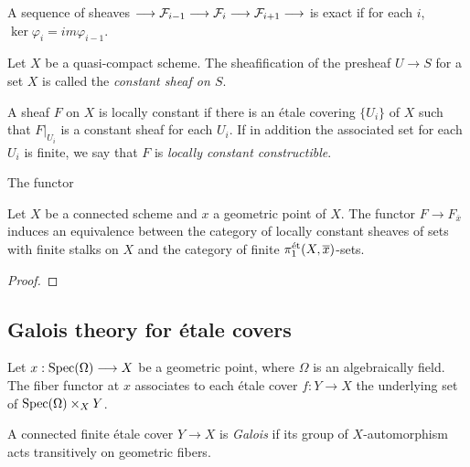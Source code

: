 \begin{definition}
  A sequence of sheaves $\longrightarrow \mathcal{F}_{i-1} \longrightarrow \mathcal{F}_{i} \longrightarrow \mathcal{F}_{i+1} \longrightarrow$
	is exact if for each $i$, $\ker \varphi_i = im \varphi_{i-1}$.
\end{definition}

\begin{definition}
  Let $X$ be a quasi-compact scheme. The sheafification of the presheaf $U \to S$ for a set $X$ is called the \textit{constant sheaf on $S$}.
\end{definition}

\begin{definition}
  A sheaf $F$ on $X$ is locally constant if there is an \'etale covering $\{U_i\}$ of $X$ such that $F|_{U_i}$ is a constant sheaf for each $U_i$. If in addition the associated set for each $U_i$ is finite, we say that $F$ is \textit{locally constant constructible}.
\end{definition}

\begin{theorem}
	The functor
\end{theorem}

\begin{proposition}
  Let $X$ be a connected scheme and $x$ a geometric point of $X$. The functor $F \to F_{\overline{x}}$ induces an equivalence between the category of locally constant sheaves of sets with finite stalks on $X$ and the category of finite $\pi_1^{\text{\'et}}(X,\overline{x})$-sets.
\end{proposition}
\begin{proof}
  
\end{proof}

\subsection{Galois theory for \'etale covers}
\begin{definition}
  Let $x: \operatorname{Spec}(\Omega) \longrightarrow X$ be a geometric point, where $\Omega$ is an algebraically field. The fiber functor at $x$ associates to each \'etale cover $f: Y \to X$ the underlying set of $\operatorname{Spec}(\Omega) \times_X Y$.
\end{definition}

\begin{definition}
  A connected finite \'etale cover $Y \to X$ is \textit{Galois} if its group of $X$-automorphism acts transitively on geometric fibers.
\end{definition}

